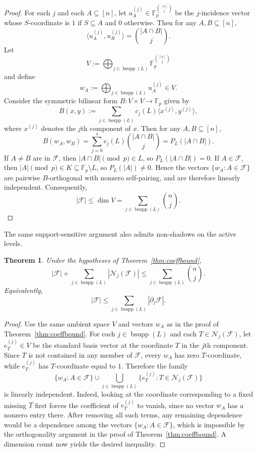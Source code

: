 \documentclass[11pt]{article}
\theoremstyle{plain}
\newtheorem{theorem}{Theorem}
\theoremstyle{remark}
\newcommand{\F}{\mathcal{F}}
\newcommand{\N}{\mathcal{N}}
\newcommand{\abs}[1]{\left|#1\right|}
\newcommand{\bsupp}{\operatorname{bsupp}}
\begin{document}
\begin{proof}
For each $j$ and each $A\subseteq[n]$, let $u_A^{(j)}\in\mathbb{F}_p^{\binom{[n]}{j}}$ be the $j$-incidence vector
whose $S$-coordinate is $1$ if $S\subseteq A$ and $0$ otherwise.
Then for any $A,B\subseteq[n]$,
$$
  \langle u_A^{(j)},u_B^{(j)}\rangle=\binom{\abs{A\cap B}}{j}.
$$
Let
$$
  V:=\bigoplus_{j\in\bsupp(L)}\mathbb{F}_p^{\binom{[n]}{j}}
$$
and define
$$
  w_A:=\bigoplus_{j\in\bsupp(L)}u_A^{(j)}\in V.
$$
Consider the symmetric bilinear form $B:V\times V\to\mathbb{F}_p$ given by
$$
  B(x,y):=\sum_{j\in\bsupp(L)} c_j(L)\langle x^{(j)},y^{(j)}\rangle,
$$
where $x^{(j)}$ denotes the $j$th component of $x$.
Then for any $A,B\subseteq[n]$,
$$
  B(w_A,w_B)=\sum_{j=0}^{s}c_j(L)\binom{\abs{A\cap B}}{j}=P_L(\abs{A\cap B}).
$$
If $A\neq B$ are in $\F$, then $\abs{A\cap B}\pmod p\in L$, so $P_L(\abs{A\cap B})=0$.
If $A\in\F$, then $\abs{A}\pmod p\in K\subseteq\mathbb{F}_p\setminus L$, so $P_L(\abs{A})\neq 0$.
Hence the vectors $\{w_A:A\in\F\}$ are pairwise $B$-orthogonal with nonzero self-pairing, and are therefore
linearly independent.
Consequently,
$$
  \abs{\F}\le \dim V=\sum_{j\in\bsupp(L)}\binom{n}{j}.
$$
\end{proof}

The same support-sensitive argument also admits non-shadows on the active levels.

\begin{theorem}\label{thm:coeffbound-nonshadow}
Under the hypotheses of Theorem~\ref{thm:coeffbound},
$$
  \abs{\F}+\sum_{j\in\bsupp(L)}\abs{\N_j(\F)}\le \sum_{j\in\bsupp(L)}\binom{n}{j}.
$$
Equivalently,
$$
  \abs{\F}\le \sum_{j\in\bsupp(L)}\abs{\partial_j\F}.
$$
\end{theorem}

\begin{proof}
Use the same ambient space $V$ and vectors $w_A$ as in the proof of Theorem~\ref{thm:coeffbound}.
For each $j\in\bsupp(L)$ and each $T\in\N_j(\F)$, let $e_T^{(j)}\in V$ be the standard basis vector at the
coordinate $T$ in the $j$th component.
Since $T$ is not contained in any member of $\F$, every $w_A$ has zero $T$-coordinate, while
$e_T^{(j)}$ has $T$-coordinate equal to $1$.
Therefore the family
$$
  \{w_A:A\in\F\}\cup \bigcup_{j\in\bsupp(L)}\{e_T^{(j)}:T\in\N_j(\F)\}
$$
is linearly independent. Indeed, looking at the coordinate corresponding to a fixed missing $T$ first forces the coefficient of
$e_T^{(j)}$ to vanish, since no vector $w_A$ has a nonzero entry there.
After removing all such terms, any remaining dependence would be a dependence among the vectors
$\{w_A:A\in\F\}$, which is impossible by the orthogonality argument in the proof of
Theorem~\ref{thm:coeffbound}.
A dimension count now yields the desired inequality.
\end{proof}
\end{document}

